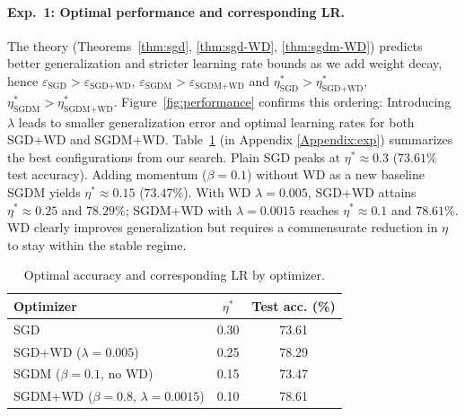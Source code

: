 \paragraph{Exp.\ 1: Optimal performance and corresponding LR.}
The theory (Theorems~\ref{thm:sgd}, \ref{thm:sgd-WD}, \ref{thm:sgdm-WD}) predicts better generalization and stricter learning rate bounds as we add weight decay, hence $\varepsilon_{\text{SGD}} > \varepsilon_{\text{SGD+WD}}$, $\varepsilon_{\text{SGDM}} > \varepsilon_{\text{SGDM+WD}}$ and $\eta^*_{\text{SGD}} > \eta^*_{\text{SGD+WD}}$, $\eta^*_{\text{SGDM}} > \eta^*_{\text{SGDM+WD}}$. Figure~\ref{fig:performance} confirms this ordering: Introducing $\lambda$ leads to smaller generalization error and optimal learning rates for both SGD+WD and SGDM+WD. Table~\ref{tab:exp1} (in Appendix \ref{Appendix:exp}) summarizes the best configurations from our search. Plain SGD peaks at $\eta^* \approx 0.3$ ($73.61\%$ test accuracy). 
Adding momentum ($\beta{=}0.1$) without WD as a new baseline SGDM yields $\eta^* \approx 0.15$ ($73.47\%$). With WD $\lambda{=}0.005$, SGD+WD attains $\eta^* \approx 0.25$ and $78.29\%$; SGDM+WD with $\lambda{=}0.0015$ reaches $\eta^* \approx 0.1$ and $78.61\%$. WD clearly improves generalization but requires a commensurate reduction in $\eta$ to stay within the stable regime.


\begin{table}[t]
\caption{Optimal accuracy and corresponding LR by optimizer.}
\label{tab:exp1}
\vspace{-0.5em}
\centering
\small
\begin{tabular}{lcc}
\toprule
Optimizer & $\eta^*$ & Test acc. (\%) \\
\midrule
SGD & 0.30 & 73.61 \\
SGD+WD ($\lambda{=}0.005$) & 0.25 & 78.29 \\
SGDM ($\beta{=}0.1$, no WD) & 0.15 & 73.47 \\
SGDM+WD ($\beta{=}0.8$, $\lambda{=}0.0015$) & 0.10 & 78.61 \\
\bottomrule
\end{tabular}
\vspace{-0.5em}
\end{table}



